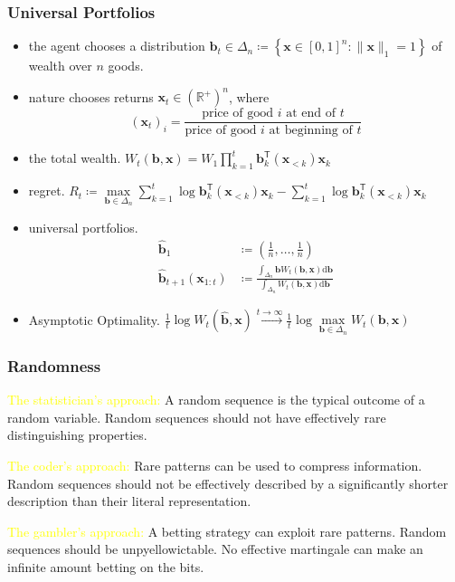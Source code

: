 \documentclass[UTF8,11pt,colorlinks,compress,openany]{beamer}%
\begin{document}
\begin{frame}\frametitle{Universal Portfolios}
	\begin{itemize}
		\item the agent chooses a distribution $\mathbf{b}_t\in\Delta_n\coloneqq \left\{\mathbf{x}\in[0,1]^n:\|\mathbf{x}\|_1=1\right\}$ of wealth over $n$ goods.
		\item nature chooses returns $\mathbf{x}_t\in(\mathbb{R}^+)^n$, where \[(\mathbf{x}_t)_i=\frac{\text{price of good $i$ at end of $t$}}{\text{price of good $i$ at beginning of $t$}}\]
		\item the total wealth.
		$W_t(\mathbf{b},\mathbf{x})=W_1\prod\limits_{k=1}^t\mathbf{b}_k^\mathsf{T}(\mathbf{x}_{<k})\mathbf{x}_k$
		\item regret.
		$R_t\coloneqq \max\limits_{\mathbf{b}\in\Delta_n}\sum\limits_{k=1}^t\log \mathbf{b}_k^\mathsf{T}(\mathbf{x}_{<k})\mathbf{x}_k-\sum\limits_{k=1}^t\log \mathbf{b}_k^\mathsf{T}(\mathbf{x}_{<k})\mathbf{x}_k$
		\item universal portfolios.
		\begin{align*}
		\hat{\mathbf{b}}_1&\coloneqq \left(\tfrac{1}{n},\dots,\tfrac{1}{n}\right)\\
		\hat{\mathbf{b}}_{t+1}(\mathbf{x}_{1:t})&\coloneqq \frac{\int_{\Delta_n}\!\!\mathbf{b} W_t(\mathbf{b},\mathbf{x})\mathrm{d}\mathbf{b}}{\int_{\Delta_n}\!\!W_t(\mathbf{b},\mathbf{x})\mathrm{d}\mathbf{b}}
		\end{align*}
		\item Asymptotic Optimality.
		$\frac{1}{t}\log W_t(\hat{\mathbf{b}},\mathbf{x})\xrightarrow{t\to\infty}\frac{1}{t}\log \max\limits_{\mathbf{b}\in\Delta_n}W_t(\mathbf{b},\mathbf{x})$
	\end{itemize}
\end{frame}

\begin{frame}\frametitle{Randomness}
\begin{description}
	\item[\textcolor{green}{Typicalness}] \textcolor{yellow}{The statistician's approach:} A random sequence is the typical outcome of a random variable. Random sequences should not have effectively rare distinguishing properties.
	\item[\textcolor{green}{Incompressibility}] \textcolor{yellow}{The coder's approach:} Rare patterns can be used to compress information. Random sequences should not be effectively described by a significantly shorter description than their literal representation.
	\item[\textcolor{green}{Unpredictability}] \textcolor{yellow}{The gambler's approach:} A betting strategy can exploit rare patterns. Random sequences should be unpyellowictable. No effective martingale can make an infinite amount betting on the bits.
\end{description}
\end{frame}
\end{document}
